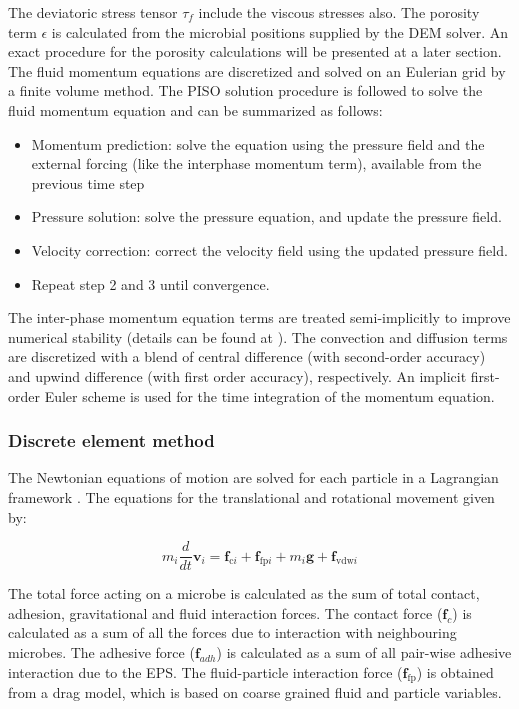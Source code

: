 \documentclass[11pt,a4paper,openright]{article}
\begin{document}
The deviatoric stress tensor $\tau_{f}$ include the viscous stresses also. The porosity term $\epsilon$ is calculated from the microbial positions supplied by the DEM solver. An exact procedure for the porosity calculations will be presented at a later section. The fluid momentum equations are discretized and solved on an Eulerian grid by a finite volume method. The PISO solution procedure is followed to solve the fluid momentum equation and can be summarized as follows:

\begin{itemize}
\item Momentum prediction: solve the equation using the pressure field and the external forcing (like the interphase momentum term), available from the previous time step
\item Pressure solution: solve the pressure equation, and update the pressure field.
\item Velocity correction: correct the velocity field using the updated pressure field.
\item Repeat step 2 and 3 until convergence. 
\end{itemize}
 
The inter-phase momentum equation terms are treated semi-implicitly to improve numerical stability (details can be found at \citet{xiao2011algorithms}). The convection and diffusion terms are discretized with a blend of central difference (with second-order accuracy) and upwind difference (with first order accuracy), respectively. An implicit first-order Euler scheme is used for the time integration of the momentum equation.

\subsubsection{Discrete element method}
\label{sec:DEM}
The Newtonian equations of motion are solved for each particle in a Lagrangian framework \citep{cundall1979discrete}. The equations for the translational and rotational movement given by:

\begin{equation}
\label{eq:DEM_TranslationalEQ}
m_{i}\frac{d}{dt}\mathbf{v}_i =\mathbf{f}_{\mathrm{c}i} + \mathbf{f}_{\mathrm{fp}i} + m_i \mathbf{g} + \mathbf{f}_{\mathrm{vdw}i}
\end{equation}


The total force acting on a microbe is calculated as the sum of total contact, adhesion, gravitational and fluid interaction forces. The contact force ($\mathbf{f}_c$) is calculated as a sum of all the forces due to interaction with neighbouring microbes. The adhesive force ($\mathbf{f}_{adh}$) is calculated as a sum of all pair-wise adhesive interaction due to the EPS. The fluid-particle interaction force ($\mathbf{f}_\mathrm{fp}$) is obtained from a drag model, which is based on coarse grained fluid and particle variables. 
\end{document}
